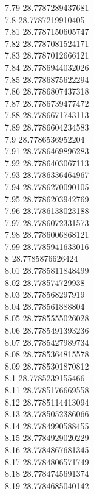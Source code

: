 {7.79	28.7787289437681\\
7.8	28.7787219910405\\
7.81	28.7787150605747\\
7.82	28.7787081524171\\
7.83	28.7787012666121\\
7.84	28.7786944032026\\
7.85	28.7786875622294\\
7.86	28.7786807437318\\
7.87	28.7786739477472\\
7.88	28.7786671743113\\
7.89	28.7786604234583\\
7.9	28.7786536952204\\
7.91	28.7786469896283\\
7.92	28.7786403067113\\
7.93	28.7786336464967\\
7.94	28.7786270090105\\
7.95	28.7786203942769\\
7.96	28.7786138023188\\
7.97	28.7786072331573\\
7.98	28.7786006868121\\
7.99	28.7785941633016\\
8	28.7785876626424\\
8.01	28.7785811848499\\
8.02	28.778574729938\\
8.03	28.778568297919\\
8.04	28.778561888804\\
8.05	28.7785555026028\\
8.06	28.7785491393236\\
8.07	28.7785427989734\\
8.08	28.7785364815578\\
8.09	28.7785301870812\\
8.1	28.7785239155466\\
8.11	28.7785176669558\\
8.12	28.7785114413094\\
8.13	28.7785052386066\\
8.14	28.7784990588455\\
8.15	28.7784929020229\\
8.16	28.7784867681345\\
8.17	28.7784806571749\\
8.18	28.7784745691374\\
8.19	28.7784685040142\\
}
